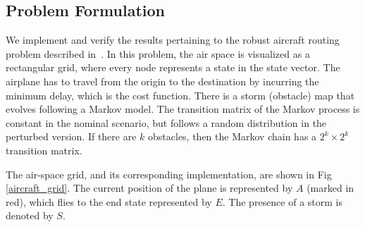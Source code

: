 \documentclass[11pt,reqno]{amsart}
\theoremstyle{definition}
\numberwithin{equation}{section}
\theoremstyle{remark}
\begin{document}

\subsection{Problem Formulation}

We implement and verify the results pertaining to the robust aircraft routing problem described in~\cite{nilim2005robust}. In this problem, the air space is visualized as a rectangular grid, where every node represents a state in the state vector. The airplane has to travel from the origin to the destination by incurring the minimum delay, which is the cost function. There is a storm (obstacle) map that evolves following a Markov model. The transition matrix of the Markov process is constant in the nominal scenario, but follows a random distribution in the perturbed version. If there are $k$ obstacles, then the Markov chain has a $2^k \times 2^k$ transition matrix.

\medskip

The air-space grid, and its corresponding implementation, are shown in Fig \ref{aircraft_grid}. The current position of the plane is represented by $A$ (marked in red), which flies to the end state represented by $E$. The presence of a storm is denoted by $S$. 
\end{document}
